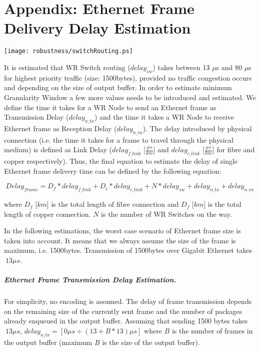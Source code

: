 \chapter{Appendix: Ethernet Frame Delivery Delay Estimation}
\label{appH}

\begin{center}
	\texttt{[image: robustness/switchRouting.ps]}
	\label{fig:swRouting}
\end{center}

It is estimated that WR Switch routing ($delay_{sw}$) takes between
13 $\mu$s and 80 $\mu$s for highest priority traffic (size: 1500bytes), provided
no traffic congestion occurs and depending on the size of output buffer. In
order to estimate minimum Granularity Window a few more values needs to be
introduced and estimated. We define the time it takes for a WR Node to send an
Ethernet frame as Transmission Delay ($delay_{n\_tx}$) and the time it takes a
WR Node to receive Ethernet frame as Reception Delay ($delay_{n\_rx}$). The
delay introduced by physical connection (i.e. the time it takes for a frame to
travel through the physical medium) is defined as Link Delay ($delay_{f\_link}$
[$\frac{\mu s}{km}$] and $delay_{c\_link}$ [$\frac{\mu s}{km}$] for fibre and
copper respectively). Thus, the final equation to estimate the delay of single
Ethernet frame delivery time can be defined by the following equation:

\begin{equation}
	Delay_{frame} = D_{f} * delay_{f\_link} + D_{c} * delay_{c\_link} + 
	N * delay_{sw} + delay_{n\_tx} + delay_{n\_rx}
\end{equation}	    

where $D_f$ [$km$] is the total length of fibre connection and $D_f$ [$km$] is
the total length of copper connection. $N$ is the number of WR Switches on
the way.

In the following estimations, the worst case scenario of Ethernet frame size is
taken into account. It means that we always assume the size of the frame is
maximum, i.e. 1500bytes. Transmission of 1500bytes over Gigabit Ethernet takes
$~13\mu s$. 


\paragraph{Ethernet Frame Transmission Delay Estimation.} 

For simplicity, no encoding is assumed. The delay of frame transmission depends
on the remaining size of the currently sent frame and the number of packages
already enqueued in the output buffer. Assuming that sending 1500 bytes takes
$~13\mu s$, $delay_{n\_tx}= [ 0 \mu s \div (13 + B * 13)\mu s]$
where $B$ is the number of frames in the output buffer (maximum $B$ is the size
of the output buffer). 

